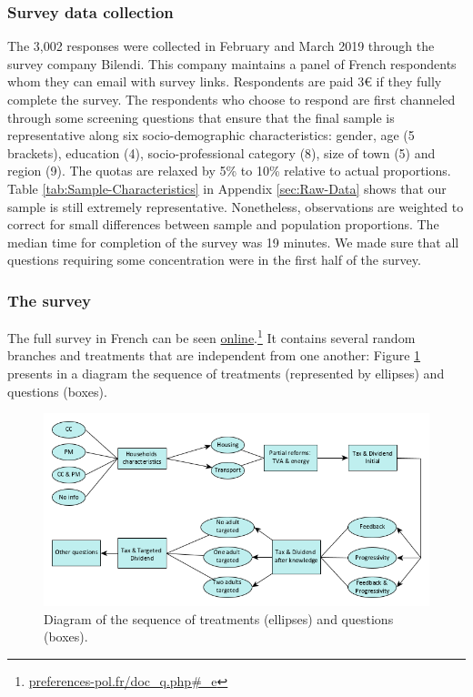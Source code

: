 \documentclass[11pt]{article}
\begin{document}
\subsubsection{Survey data collection }

The 3,002 responses were collected in February and March 2019 through the survey company Bilendi. This company maintains a panel of French respondents whom they can email with survey links. Respondents are
paid 3\euro{} if they fully complete the survey. The respondents who choose to respond are first channeled through some screening questions that ensure that the final sample is representative along six socio-demographic characteristics: gender, age (5 brackets), education (4), socio-professional category (8), size of town (5) and region (9). The quotas are relaxed by 5\% to 10\% relative to actual proportions. Table \ref{tab:Sample-Characteristics} in Appendix \ref{sec:Raw-Data} shows that our sample is still extremely representative. Nonetheless, observations are weighted to correct for small differences between sample and population proportions. The median time for completion of the survey was 19 minutes. We made sure that all questions requiring some concentration were in the first half of the survey. %

\subsubsection{The survey \label{subsubsec:the-survey}}

The full survey in French can be seen \href{http://preferences-pol.fr/doc_q.php#_e}{online}.\footnote{\href{http:\/\/preferences-pol.fr\/doc\_q.php\#\_e}{preferences-pol.fr/doc\_q.php\#\_e}} It contains several random branches and treatments that are independent from one another: Figure \ref{fig:survey} presents in a diagram the sequence of treatments (represented by ellipses) and questions (boxes).

\begin{figure}[H]
\centering
\includegraphics[width=1\columnwidth]{Images/diagram_survey_initial.png}
\caption{Diagram of the sequence of treatments (ellipses) and questions (boxes).}
\label{fig:survey}
\end{figure}
\end{document}
